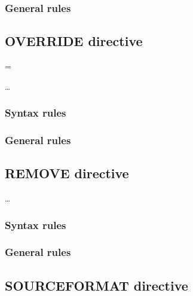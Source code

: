 \subsubsection{General rules}

\subsection{OVERRIDE directive}

\begin{syntax}[\miscextcolour]
  \begin{1=}
    \literal = \literal
  \end{1=} \dots
\end{syntax}

\subsubsection{Syntax rules}

\subsubsection{General rules}

\subsection{REMOVE directive}

\begin{syntax}[\miscextcolour]
   \literal \dots
\end{syntax}

\subsubsection{Syntax rules}

\subsubsection{General rules}

\subsection{SOURCEFORMAT directive}

\begin{syntax}[\miscextcolour]
  \begin{1=}
     \\
  \end{1=}
  \literal
\end{syntax}


